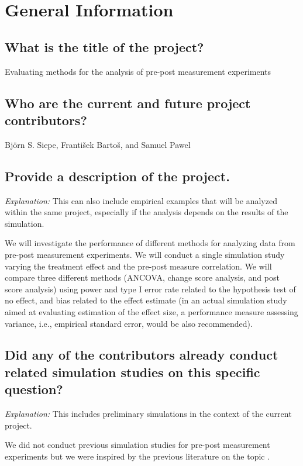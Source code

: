 \documentclass[12pt]{article}
\begin{document}
\section{General Information}
\subsection{What is the title of the project?}
\begin{examplebox}
    Evaluating methods for the analysis of pre-post measurement experiments
\end{examplebox}


\subsection{Who are the current and future project contributors?}
\begin{examplebox}
    Björn S. Siepe, František Bartoš, and Samuel Pawel
\end{examplebox}


\subsection{Provide a description of the project.}
\textit{Explanation:} This can also include empirical examples that will be analyzed within the same project, especially if the analysis depends on the results of the simulation.
\begin{examplebox}
    We will investigate the performance of different methods for analyzing data from pre-post measurement experiments. We will conduct a single simulation study varying the treatment effect and the pre-post measure correlation. We will compare three different methods (ANCOVA, change score analysis, and post score analysis) using power and type I error rate related to the hypothesis test of no effect, and bias related to the effect estimate (in an actual simulation study aimed at evaluating estimation of the effect size, a performance measure assessing variance, i.e., empirical standard error, would be also recommended).
\end{examplebox}

\subsection{Did any of the contributors already conduct related simulation studies on this specific question?}
\textit{Explanation:} This includes preliminary simulations in the context of the current project.
\begin{examplebox}
    We did not conduct previous simulation studies for pre-post measurement experiments but we were inspired by the previous literature on the topic \parencite{vickers2001use, senn2006change, van2013ancova, clifton2019correlation, ludtke2023ancova}.
\end{examplebox}
\end{document}
